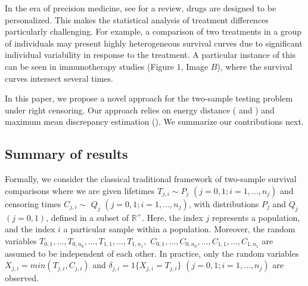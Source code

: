 \documentclass[11pt]{article}
\begin{document}
In the era of precision medicine, see \cite{kosorok2019precision} for a review,  drugs are designed to be personalized. This makes  the statistical  analysis  of  treatment  differences particularly  challenging. For example,  a comparison of two treatments in a group of individuals may present highly heterogeneous survival curves due to significant individual variability in response to the treatment. A particular instance of this can be seen in  immunotherapy studies \cite{ferris2016nivolumab}  (Figure $1$, Image $B$), where  the survival curves intersect several times. 



In this paper,  we propose a novel approach for the  two-sample  testing problem under right  censoring. Our approach  relies on   energy distance
 (\citealt{szekely2003statistics} and \citealt{szekely2013energy}) and  maximum mean discrepancy estimation (\citealt{gretton2012kernel}).  We summarize  our  contributions next.




 

\subsection{Summary of results}
\label{sec:summary}

Formally,  we consider  the  classical traditional framework of two-sample  survival comparisons where we are given  lifetimes $T_{j,i} \sim P_j$ $(j=0,1; i=1,\dots,n_j)$ and censoring times $C_{j,i} \sim$ $Q_j$ $(j=0,1; i=1,\dots,n_j)$, with distributions   $P_j$ and $Q_j$  $(j=0,1)$, defined in a subset of $\mathbb{R^{+}}$. Here,  the index   $j$  represents  a population, and the index  $i$  a particular  sample within a   population. Moreover, the random variables  $T_{0,1},\dots,T_{0,n_0},\dots,T_{1,1},\dots,T_{1,n_1},$ $ C_{0,1},\dots,C_{0,n_0},\dots,C_{1,1},\dots,C_{1,n_1}$ are assumed to be independent of each other. In practice, only the random variables  $X_{j,i}= min(T_{j,i},C_{j,i})$  and $\delta_{j,i}= 1\{X_{j,i} = T_{j,i}\}$	$(j=0,1; i=1,\dots,n_j)$ are observed. %
\end{document}
